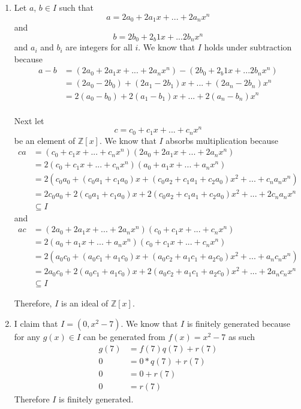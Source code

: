 \documentclass{article}
\begin{document}
\begin{enumerate}
\item
Let $a$, $b \in I$ such that
\[a = 2a_0 + 2a_{1}x + ... + 2a_{n}x^n
\]
and
\[b = 2b_0 + 2_b{1}x + ... 2b_{n}x^n
\]
and $a_i$ and $b_i$ are integers for all
$i$.  We know that $I$ holds under subtraction because
\begin{align*}
a - b &= (2a_0 + 2a_{1}x + ... + 2a_{n}x^{n}) - (2b_0 + 2_b{1}x + ... 2b_{n}x^n) \\
&= (2a_0 - 2b_0) + (2a_{1} - 2b_{1})x + ... + (2a_{n} - 2b_{n})x^n \\
&= 2(a_0 - b_0) + 2(a_{1} - b_{1})x + ... + 2(a_{n} - b_{n})x^n \\
\end{align*}

Next let
\[
c = c_0 + c_{1}x + ... + c_{n}x^n
\]
be an element of $\mathbb{Z}[x]$.
We know that $I$ absorbs multiplication because
\begin{align*}
ca &= (c_0 + c_{1}x + ... + c_{n}x^{n})(2a_0 + 2a_{1}x + ...+ 2a_{n}x^{n}) \\
&= 2(c_0 + c_{1}x + ... + c_{n}x^{n})(a_0 + a_{1}x + ... + a_{n}x^{n}) \\
&= 2(c_{0}a_{0} + (c_{0}a_{1} + c_{1}a_{0})x + (c_{0}a_{2} + c_{1}a_{1} + c_{2}a_{0})x^{2}
+ ... + c_{n}a_{n}x^{n}) \\
&= 2c_{0}a_{0} + 2(c_{0}a_{1} + c_{1}a_{0})x + 2(c_{0}a_{2} + c_{1}a_{1} + c_{2}a_{0})x^{2}
+ ... + 2c_{n}a_{n}x^{n} \\
&\subseteq I
\end{align*}
and
\begin{align*}
ac &= (2a_0 + 2a_{1}x + ...+ 2a_{n}x^{n})(c_0 + c_{1}x + ... + c_{n}x^{n}) \\
&= 2(a_0 + a_{1}x + ... + a_{n}x^{n})(c_0 + c_{1}x + ... + c_{n}x^{n}) \\
&= 2(a_{0}c_{0} + (a_{0}c_{1} + a_{1}c_{0})x + (a_{0}c_{2} + a_{1}c_{1} + a_{2}c_{0})x^{2}
+ ... + a_{n}c_{n}x^{n}) \\
&= 2a_{0}c_{0} + 2(a_{0}c_{1} + a_{1}c_{0})x + 2(a_{0}c_{2} + a_{1}c_{1} + a_{2}c_{0})x^{2}
+ ... + 2a_{n}c_{n}x^{n} \\
&\subseteq I
\end{align*}

Therefore, $I$ is an ideal of $\mathbb{Z}[x]$.

\item I claim that $I = (0, x^2 - 7)$.  We know that $I$ is finitely generated
because for any $g(x) \in I$ can be generated from $f(x) = x^2 - 7$ as such
\begin{align*}
g(7) &= f(7)q(7) + r(7) \\
0 &= 0*q(7) + r(7) \\
0 &= 0 + r(7) \\
0 &= r(7)
\end{align*}
Therefore $I$ is finitely generated.


\end{enumerate}
\end{document}
